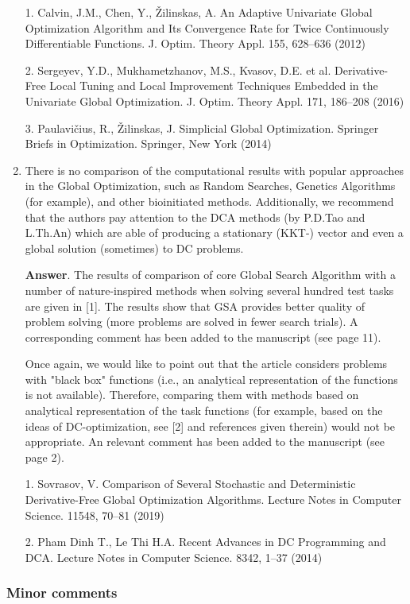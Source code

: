 \documentclass{article}%
\begin{document}
\begin{enumerate}
1. Calvin, J.M., Chen, Y., {\v Z}ilinskas, A. An Adaptive Univariate Global Optimization Algorithm and Its Convergence Rate for Twice Continuously Differentiable Functions. J. Optim. Theory Appl. 155, 628–636 (2012)

2. Sergeyev, Y.D., Mukhametzhanov, M.S., Kvasov, D.E. et al. Derivative-Free Local Tuning and Local Improvement Techniques Embedded in the Univariate Global Optimization. J. Optim. Theory Appl. 171, 186--208 (2016)

3. Paulavi{\v c}ius, R., {\v Z}ilinskas, J. Simplicial Global Optimization. Springer Briefs in Optimization. Springer, New York (2014)


\item There is no comparison of the computational results with popular approaches in the Global Optimization, such as Random Searches, Genetics Algorithms (for example), and other bioinitiated methods.
Additionally, we recommend that the authors pay attention to the DCA methods (by P.D.Tao and L.Th.An) which are able of producing a stationary (KKT-) vector and even a global solution (sometimes) to DC problems.

\textbf{Answer}.
The results of comparison of core Global Search Algorithm with a number of nature-inspired methods when solving several hundred test tasks are given in [1]. The results show that GSA provides better quality of problem solving (more problems are solved in fewer search trials). A corresponding comment has been added to the manuscript (see page 11).

Once again, we would like to point out that the article considers problems with "black box" functions (i.e., an analytical representation of the functions is not available). Therefore, comparing them with methods based on analytical representation of the task functions (for example, based on the ideas of DC-optimization, see [2] and references given therein) would not be appropriate. An relevant comment has been added to the manuscript (see page 2).


1. Sovrasov, V.  Comparison of Several Stochastic and Deterministic Derivative-Free Global Optimization Algorithms.  Lecture Notes in Computer Science. 11548, 70--81 (2019)

2. Pham Dinh T., Le Thi H.A. Recent Advances in DC Programming and DCA. Lecture Notes in Computer Science. 8342, 1--37 (2014)

\end{enumerate}


\subsubsection*{Minor comments}
\end{document}
